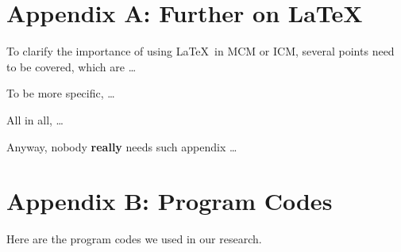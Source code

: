 \documentclass[12pt]{ctexart}
\begin{document}
\begin{subappendices}  %

	\section{Appendix A: Further on \LaTeX}
	To clarify the importance of using \LaTeX\ in MCM or ICM, several points need to be covered, which are \ldots

	To be more specific, \ldots

	All in all, \ldots

	Anyway, nobody \textbf{really} needs such appendix \ldots

	\section{Appendix B: Program Codes}
	Here are the program codes we used in our research.


	

	




\end{subappendices}  %
\end{document}
